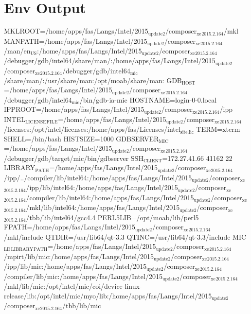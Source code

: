 \documentclass[11pt]{article}
\begin{document}
\section{Env Output}
\label{sec:orgc0c8d09}
MKLROOT=/home/apps/fas/Langs/Intel/2015\(_{\text{update2}}\)/composer\(_{\text{xe}}\)\(_{\text{2015.2.164}}\)/mkl
MANPATH=/home/apps/fas/Langs/Intel/2015\(_{\text{update2}}\)/composer\(_{\text{xe}}\)\(_{\text{2015.2.164}}\)/man/en\(_{\text{US}}\):/home/apps/fas/Langs/Intel/2015\(_{\text{update2}}\)/composer\(_{\text{xe}}\)\(_{\text{2015.2.164}}\)/debugger/gdb/intel64/share/man/:/home/apps/fas/Langs/Intel/2015\(_{\text{update2}}\)/composer\(_{\text{xe}}\)\(_{\text{2015.2.164}}\)/debugger/gdb/intel64\(_{\text{mic}}\)/share/man/:/usr/share/man:/opt/moab/share/man:
GDB\(_{\text{HOST}}\)=/home/apps/fas/Langs/Intel/2015\(_{\text{update2}}\)/composer\(_{\text{xe}}\)\(_{\text{2015.2.164}}\)/debugger/gdb/intel64\(_{\text{mic}}\)/bin/gdb-ia-mic
HOSTNAME=login-0-0.local
IPPROOT=/home/apps/fas/Langs/Intel/2015\(_{\text{update2}}\)/composer\(_{\text{xe}}\)\(_{\text{2015.2.164}}\)/ipp
INTEL\(_{\text{LICENSE}}\)\(_{\text{FILE}}\)=/home/apps/fas/Langs/Intel/2015\(_{\text{update2}}\)/composer\(_{\text{xe}}\)\(_{\text{2015.2.164}}\)/licenses:/opt/intel/licenses:/home/apps/fas/Licenses/intel\(_{\text{site.lic}}\)
TERM=xterm
SHELL=/bin/bash
HISTSIZE=1000
GDBSERVER\(_{\text{MIC}}\)=/home/apps/fas/Langs/Intel/2015\(_{\text{update2}}\)/composer\(_{\text{xe}}\)\(_{\text{2015.2.164}}\)/debugger/gdb/target/mic/bin/gdbserver
SSH\(_{\text{CLIENT}}\)=172.27.41.66 41162 22
LIBRARY\(_{\text{PATH}}\)=/home/apps/fas/Langs/Intel/2015\(_{\text{update2}}\)/composer\(_{\text{xe}}\)\(_{\text{2015.2.164}}\)/ipp/../compiler/lib/intel64:/home/apps/fas/Langs/Intel/2015\(_{\text{update2}}\)/composer\(_{\text{xe}}\)\(_{\text{2015.2.164}}\)/ipp/lib/intel64:/home/apps/fas/Langs/Intel/2015\(_{\text{update2}}\)/composer\(_{\text{xe}}\)\(_{\text{2015.2.164}}\)/compiler/lib/intel64:/home/apps/fas/Langs/Intel/2015\(_{\text{update2}}\)/composer\(_{\text{xe}}\)\(_{\text{2015.2.164}}\)/mkl/lib/intel64:/home/apps/fas/Langs/Intel/2015\(_{\text{update2}}\)/composer\(_{\text{xe}}\)\(_{\text{2015.2.164}}\)/tbb/lib/intel64/gcc4.4
PERL5LIB=/opt/moab/lib/perl5
FPATH=/home/apps/fas/Langs/Intel/2015\(_{\text{update2}}\)/composer\(_{\text{xe}}\)\(_{\text{2015.2.164}}\)/mkl/include
QTDIR=/usr/lib64/qt-3.3
QTINC=/usr/lib64/qt-3.3/include
MIC\(_{\text{LD}}\)\(_{\text{LIBRARY}}\)\(_{\text{PATH}}\)=/home/apps/fas/Langs/Intel/2015\(_{\text{update2}}\)/composer\(_{\text{xe}}\)\(_{\text{2015.2.164}}\)/mpirt/lib/mic:/home/apps/fas/Langs/Intel/2015\(_{\text{update2}}\)/composer\(_{\text{xe}}\)\(_{\text{2015.2.164}}\)/ipp/lib/mic:/home/apps/fas/Langs/Intel/2015\(_{\text{update2}}\)/composer\(_{\text{xe}}\)\(_{\text{2015.2.164}}\)/compiler/lib/mic:/home/apps/fas/Langs/Intel/2015\(_{\text{update2}}\)/composer\(_{\text{xe}}\)\(_{\text{2015.2.164}}\)/mkl/lib/mic:/opt/intel/mic/coi/device-linux-release/lib:/opt/intel/mic/myo/lib:/home/apps/fas/Langs/Intel/2015\(_{\text{update2}}\)/composer\(_{\text{xe}}\)\(_{\text{2015.2.164}}\)/tbb/lib/mic
\end{document}
